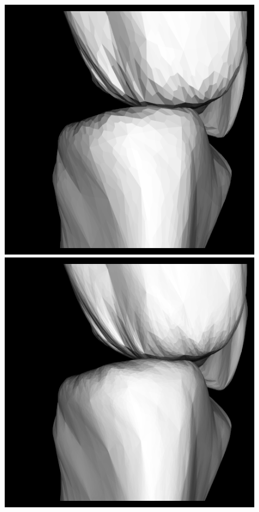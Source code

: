 \documentclass[10pt, conference, compsocconf]{IEEEtran}
\begin{document}
\begin{figure}[htbp]
{\begin{minipage}[h]{0.16\linewidth}
        \includegraphics[width=\textwidth]{./Figure/footbones/end/catmull2.png}\\
        \includegraphics[width=\textwidth]{./Figure/footbones/end/catmull3.png}\vspace{1ex}\\

\end{minipage}}
\end{figure}
\end{document}
